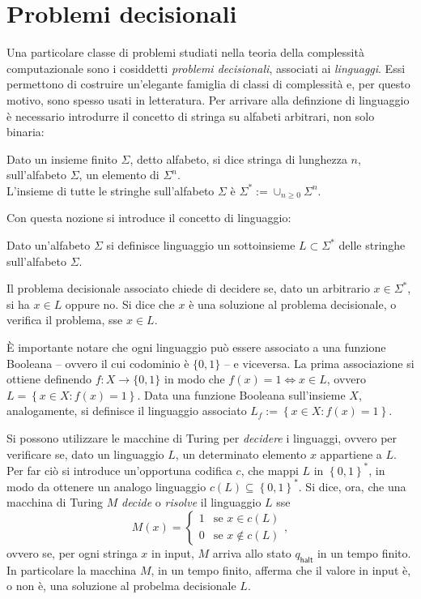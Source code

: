\section{Problemi decisionali}
Una particolare classe di problemi studiati nella teoria della complessità computazionale sono i cosiddetti \textit{problemi decisionali}, associati ai \textit{linguaggi}.
Essi permettono di costruire un'elegante famiglia di classi di complessità e, per questo motivo, sono spesso usati in letteratura.
Per arrivare alla definzione di linguaggio è necessario introdurre il concetto di stringa su alfabeti arbitrari, non solo binaria:
\begin{defn}
 Dato un insieme finito $\Sigma$, detto alfabeto, si dice stringa di lunghezza $n$, sull'alfabeto $\Sigma$, un elemento di $\Sigma^n$.\\
 L'insieme di tutte le stringhe sull'alfabeto $\Sigma$ è $\Sigma^* := \cup_{n\geq0}\Sigma^n$.
\end{defn}
Con questa nozione si introduce il concetto di linguaggio:
\begin{defn}[Linguaggio]
 Dato un'alfabeto $\Sigma$ si definisce {\upshape linguaggio} un sottoinsieme $L \subset \Sigma^*$ delle stringhe sull'alfabeto $\Sigma$.
\end{defn}
Il problema decisionale associato chiede di decidere se, dato un arbitrario $x \in \Sigma^*$, si ha $x \in L$ oppure no.
Si dice che $x$ è una soluzione al problema decisionale, o verifica il problema, sse $x \in L$.

È importante notare che ogni linguaggio può essere associato a una funzione Booleana -- ovvero il cui codominio è $\{0,1\}$ -- e viceversa.
La prima associazione si ottiene definendo $f: X \to \{0,1\}$ in modo che $f(x) = 1 \iff x \in L$, ovvero $L = \left\{x \in X : f(x) = 1\right\}$.
Data una funzione Booleana sull'insieme $X$, analogamente, si definisce il linguaggio associato $L_f := \left\{x \in X : f(x) = 1\right\}$.

Si possono utilizzare le macchine di Turing per \textit{decidere} i linguaggi, ovvero per verificare se, dato un linguaggio $L$, un determinato elemento $x$ appartiene a $L$.
Per far ciò si introduce un'opportuna codifica $c$, che mappi $L$ in $\left\{0,1\right\}^*$, in modo da ottenere un analogo linguaggio $c(L) \subseteq \left\{0,1\right\}^*$.
Si dice, ora, che una macchina di Turing $M$ \textit{decide} o \textit{risolve} il linguaggio $L$ sse
\begin{equation}
 M(x) = 
 \begin{cases}
  1     & \text{se } x \in c(L)\\
  0     & \text{se } x \notin c(L)
 \end{cases},
\end{equation}
ovvero se, per ogni stringa $x$ in input, $M$ arriva allo stato $q_{\mathsf{halt}}$ in un tempo finito.
In particolare la macchina $M$, in un tempo finito, afferma che il valore in input è, o non è, una soluzione al probelma decisionale $L$.


